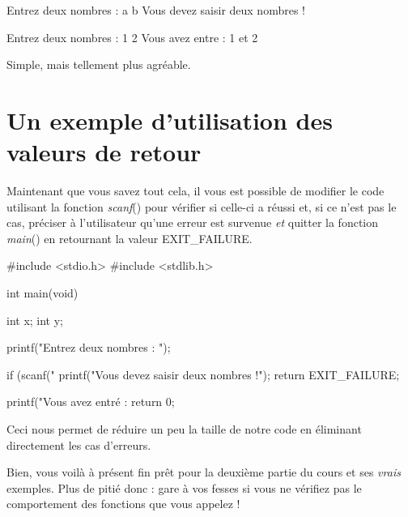 \begin{C}
Entrez deux nombres : a b
Vous devez saisir deux nombres !

Entrez deux nombres : 1 2
Vous avez entre : 1 et 2
\end{C}

Simple, mais tellement plus agréable.


\section{Un exemple d'utilisation des valeurs de retour }
\label{un-exemple-d-utilisation-des-valeurs-de-retour }

Maintenant que vous savez tout cela, il vous est possible de modifier le code utilisant la fonction
\emph{scanf}() pour vérifier si celle-ci a réussi et, si ce n'est pas le
cas, préciser à l'utilisateur qu'une erreur est survenue \emph{et}
quitter la fonction \emph{main}() en retournant la valeur EXIT\_FAILURE.

\begin{C}
#include <stdio.h>
#include <stdlib.h>


int main(void)
{
    int x;
    int y;

    printf("Entrez deux nombres : ");

    if (scanf("%
    {
        printf("Vous devez saisir deux nombres !\n");
        return EXIT_FAILURE;
    }

    printf("Vous avez entré : %
    return 0;
}
\end{C}

Ceci nous permet de réduire un peu la taille de notre code en éliminant
directement les cas d'erreurs.

\hrulefill

Bien, vous voilà à présent fin prêt pour la deuxième partie du cours et
ses \emph{vrais} exemples. Plus de pitié donc : gare à vos fesses si vous ne vérifiez pas le comportement des fonctions que vous appelez !
